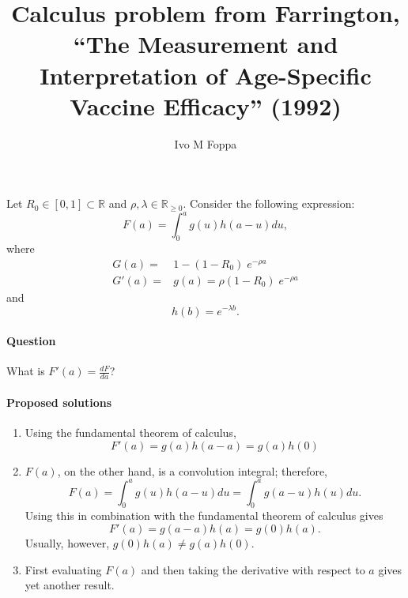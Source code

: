 \documentclass{article}[12pt]
\title{Calculus problem from Farrington, ``The Measurement and Interpretation of Age-Specific Vaccine Efficacy'' (1992)}
\author{Ivo M Foppa}
\begin{document}
%
\maketitle%
%
%
Let $R_0 \in [0,1] \subset  \mathbb{R}$ and $\rho,\lambda \in \mathbb{R}_{\ge 0}$.
%
Consider the following expression:
%
\begin{equation}
\label{eq:conv_integral}
F(a) = \int_{0}^{a} g(u) h(a-u) du,
\end{equation}
%
where
\begin{align}
\label{eq:Ga}
G(a) =& 1-(1-R_0) \;e^{-\rho a}\\
\label{eq:Ga_deriv}
G'(a)=&g(a) = \rho (1-R_0) \;e^{-\rho a}
\end{align}
%
and 
\begin{equation}
\label{eq:h}
h(b)=e^{-\lambda b}.
\end{equation} 
%
\paragraph{Question}
What is $F'(a) = \frac{dF}{da}$?
%
\paragraph{Proposed solutions}
\begin{enumerate}
	\item Using the fundamental theorem of calculus, 
	\begin{equation*}
	F'(a)= g(a) h(a-a) = g(a) h(0)
	\end{equation*}
	\item $F(a)$, on the other hand, is a convolution integral; therefore,
	\begin{equation*}
	F(a) = \int_{0}^{a} g(u) h(a-u) du = \int_{0}^{a} g(a-u) h(u) du.
	\end{equation*} 
	Using this in combination with the fundamental theorem of calculus gives 
	\begin{equation*}
	F'(a)= g(a-a) h(a) = g(0) h(a).
	\end{equation*} 
	Usually, however, $g(0) h(a) \neq g(a) h(0)$.
	\item First evaluating $F(a)$ and then taking the derivative with respect to $a$ gives yet another result.
\end{enumerate}
%
%
\end{document}
